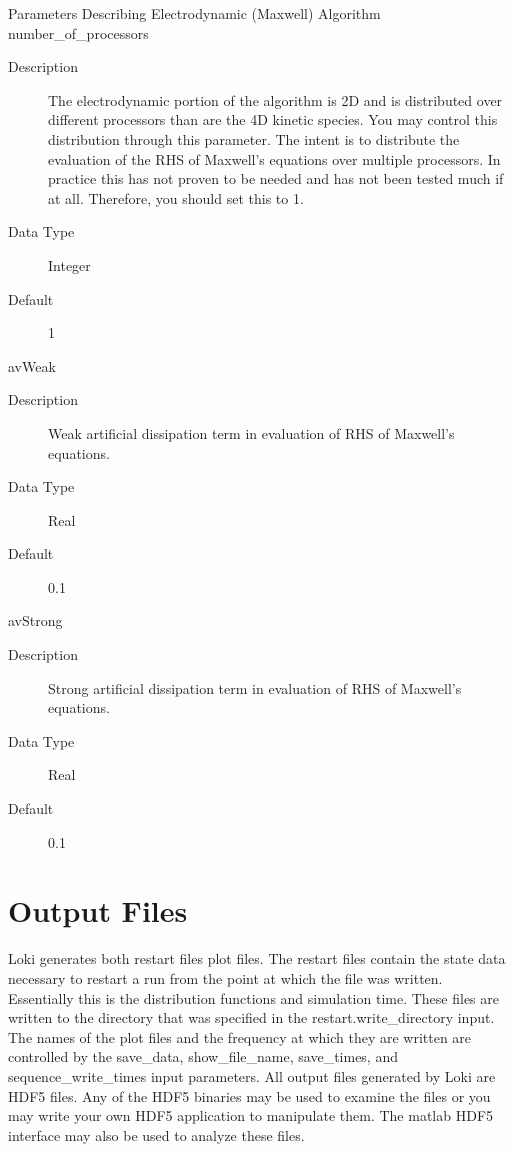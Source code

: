 \documentclass[11pt]{amsart}
\begin{document}
\noindent Parameters Describing Electrodynamic (Maxwell) Algorithm \\
\indent number\_of\_processors
\begin{description}
\item [Description] The electrodynamic portion of the algorithm is 2D and is
distributed over different processors than are the 4D kinetic species.  You
may control this distribution through this parameter.  The intent is to
distribute the evaluation of the RHS of Maxwell's equations over multiple
processors.  In practice this has not proven to be needed and has not been
tested much if at all.  Therefore, you should set this to 1.
\item [Data Type] Integer
\item [Default] 1
\end{description}

avWeak
\begin{description}
\item [Description] Weak artificial dissipation term in evaluation of RHS of
Maxwell's equations.
\item [Data Type] Real
\item [Default] 0.1
\end{description}

avStrong
\begin{description}
\item [Description] Strong artificial dissipation term in evaluation of RHS of
Maxwell's equations.
\item [Data Type] Real
\item [Default] 0.1
\end{description}

\section*{Output Files}
Loki generates both restart files plot files.  The restart files contain the
state data necessary to restart a run from the point at which the file was
written.  Essentially this is the distribution functions and simulation time.
These files are written to the directory that was specified in the
restart.write\_directory input.  The names of the plot files and the frequency
at which they are written are controlled by the save\_data, show\_file\_name,
save\_times, and sequence\_write\_times input parameters.  All output files
generated by Loki are HDF5 files.  Any of the HDF5 binaries may be used to
examine the files or you may write your own HDF5 application to manipulate
them.  The matlab HDF5 interface may also be used to analyze these files.
\end{document}
